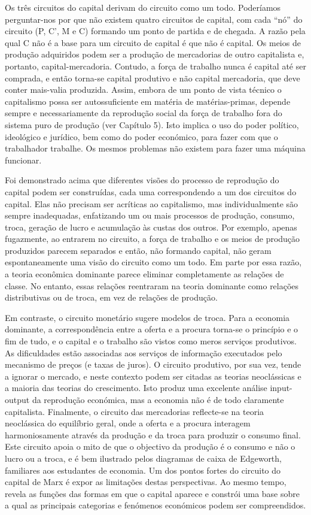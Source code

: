  \par 
Os três circuitos do capital derivam do circuito como um todo. Poderíamos perguntar-nos por que não existem quatro circuitos de capital, com cada “nó” do circuito (P, C', M e C) formando um ponto de partida e de chegada. A razão pela qual C não é a base para um circuito de capital é que não é capital. Os meios de produção adquiridos podem ser a produção de mercadorias de outro capitalista e, portanto, capital-mercadoria. Contudo, a força de trabalho nunca é capital até ser comprada, e então torna-se capital produtivo e não capital mercadoria, que deve conter mais-valia produzida. Assim, embora de um ponto de vista técnico o capitalismo possa ser autossuficiente em matéria de matérias-primas, depende sempre e necessariamente da reprodução social da força de trabalho fora do sistema puro de produção (ver Capítulo {\color{blue}5}). Isto implica o uso do poder político, ideológico e jurídico, bem como do poder económico, para fazer com que o trabalhador trabalhe. Os mesmos problemas não existem para fazer uma máquina funcionar.
 \par 
Foi demonstrado acima que diferentes visões do processo de reprodução do capital podem ser construídas, cada uma correspondendo a um dos circuitos do capital. Elas não precisam ser acríticas ao capitalismo, mas individualmente são sempre inadequadas, enfatizando um ou mais processos de produção, consumo, troca, geração de lucro e acumulação às custas dos outros. Por exemplo, apenas fugazmente, ao entrarem no circuito, a força de trabalho e os meios de produção produzidos parecem separados e então, não formando capital, não geram espontaneamente uma visão do circuito como um todo. Em parte por essa razão, a teoria econômica dominante parece eliminar completamente as relações de classe. No entanto, essas relações reentraram na teoria dominante como relações distributivas ou de troca, em vez de relações de produção.
 \par 
Em contraste, o circuito monetário sugere modelos de troca. Para a economia dominante, a correspondência entre a oferta e a procura torna-se o princípio e o fim de tudo, e o capital e o trabalho são vistos como meros serviços produtivos. As dificuldades estão associadas aos serviços de informação executados pelo mecanismo de preços (e taxas de juros). O circuito produtivo, por sua vez, tende a ignorar o mercado, e neste contexto podem ser citadas as teorias neoclássicas e a maioria das teorias do crescimento. Isto produz uma excelente análise input-output da reprodução económica, mas a economia não é de todo claramente capitalista. Finalmente, o circuito das mercadorias reflecte-se na teoria neoclássica do equilíbrio geral, onde a oferta e a procura interagem harmoniosamente através da produção e da troca para produzir o consumo final. Este circuito apoia o mito de que o objectivo da produção é o consumo e não o lucro ou a troca, e é bem ilustrado pelos diagramas de caixa de Edgeworth, familiares aos estudantes de economia. Um dos pontos fortes do circuito do capital de Marx é expor as limitações destas perspectivas. Ao mesmo tempo, revela as funções das formas em que o capital aparece e constrói uma base sobre a qual as principais categorias e fenómenos económicos podem ser compreendidos.
 \par 
